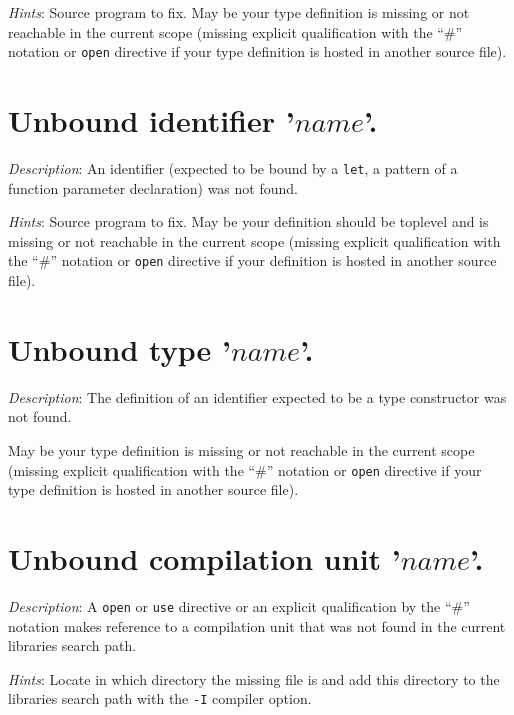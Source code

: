 {\em Hints}: Source program to fix. May be your type definition is
missing or not reachable in the current scope (missing explicit
qualification with the ``\#'' notation or {\tt open} directive if your
type definition is hosted in another source file).



\section*{Unbound identifier '$name$'.}
{\em Description}: An identifier (expected to be bound by a {\tt let},
a pattern of a function parameter declaration) was not found.

{\em Hints}: Source program to fix. May be your definition should be
toplevel and is missing or not reachable in the current scope (missing
explicit qualification with the ``\#'' notation or {\tt open}
directive if your definition is hosted in another source file).



\section*{Unbound type '$name$'.}
{\em Description}: The definition of an identifier expected to be a
type constructor was not found.

May be your type definition is missing or not reachable in the current
scope (missing explicit qualification with the ``\#'' notation or
{\tt open} directive if your type definition is hosted in another
source file).



\section*{Unbound compilation unit '$name$'.}  {\em Description}: A
{\tt open} or {\tt use} directive or an explicit qualification by the
``\#'' notation makes reference to a compilation unit that was not
found in the current libraries search path.

{\em Hints}: Locate in which directory the missing  file is
and add this directory to the libraries search path with the {\tt -I}
compiler option.



